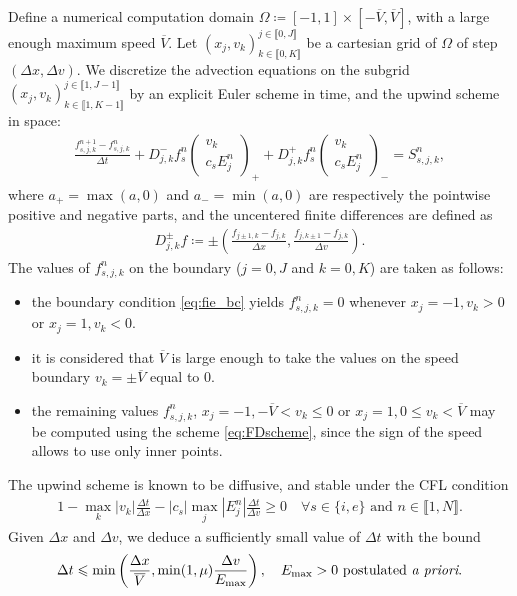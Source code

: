 \documentclass{article}
\numberwithin{equation}{section}
\newcommand{\todo}[1]{{\color{red}\textbf{#1}}}
\newcommand{\vv}[1]{\begin{pmatrix} #1 \end{pmatrix}} %
\begin{document}
Define a numerical computation domain $\Omega \coloneqq [-1,1] \times [-\overline{V},\overline{V}]$, with a large enough maximum speed $\overline{V}$. Let $(x_j, v_k)^{j\in\llbracket0,J\rrbracket}_{k\in\llbracket0,K\rrbracket}$ be a cartesian grid of $\Omega$ of step $(\Delta x, \Delta v)$. We discretize the advection equations on the subgrid $(x_j, v_k)^{j\in\llbracket1,J-1\rrbracket}_{k\in\llbracket1,K-1\rrbracket}$ by an explicit Euler scheme in time, and the upwind scheme in space:
\begin{align}\label{eq:FDscheme}
	\frac{f_{s,j,k}^{n+1} - f_{s,j,k}^{n}}{\Delta t} + D^-_{j,k} f_s^n \vv{v_k\\c_s E_j^n}_{+} +D^+_{j,k} f_s^n \vv{v_k\\c_s E_j^n}_{-} = S_{s,j,k}^n,
\end{align}
where $a_+ = \max(a,0)$ and $a_{-} = \min(a,0)$ are respectively the pointwise positive and negative parts, and the uncentered finite differences are defined as
\begin{align*}
	D^{\pm}_{j,k} f \coloneqq \pm \left(\frac{f_{j\pm 1,k} - f_{j,k}}{\Delta x}, \frac{f_{j,k\pm 1} - f_{j,k}}{\Delta v}\right).
\end{align*}
The values of $f_{s,j,k}^n$ on the boundary ($j=0, J$ and $k=0, K$) are taken as follows:
\begin{itemize}
\item the boundary condition \cref{eq:fie_bc} yields $f_{s,j,k}^n = 0$ whenever $x_j=-1, v_k > 0$ or $x_j=1, v_k < 0$.
\item it is considered that $\overline{V}$ is large enough to take the values on the speed boundary $v_k = \pm \overline{V}$ equal to 0.
\item the remaining values $f_{s,j,k}^n$, $x_j=-1, -\overline{V} < v_k \leqslant 0$ or $x_j=1, 0 \leqslant v_k < \overline{V}$ may be computed using the scheme \cref{eq:FDscheme}, since the sign of the speed allows to use only inner points.
\end{itemize}


\noindent The upwind scheme is known to be diffusive, and stable under the CFL condition 
\begin{align*}
	1 - \max_{k} |v_k| \frac{\Delta t}{\Delta x} - |c_s| \max_{j} |E^n_j| \frac{\Delta t}{\Delta v} \geqslant 0 \quad \forall s \in \{i,e\}\text{ and } n \in \llbracket1,N\rrbracket.
\end{align*}
Given $\Delta x$ and $\Delta v$, we deduce a sufficiently small value of $\Delta t$ with the bound
\begin{align*}
	\Delta t \leqslant \min\left(\frac{\Delta x}{\overline{V}}, \min(1,\mu)\frac{\Delta v}{E_{\text{max}}}\right), \quad E_{\text{max}}>0 \text{ postulated \emph{a priori}.}
\end{align*}
\end{document}
